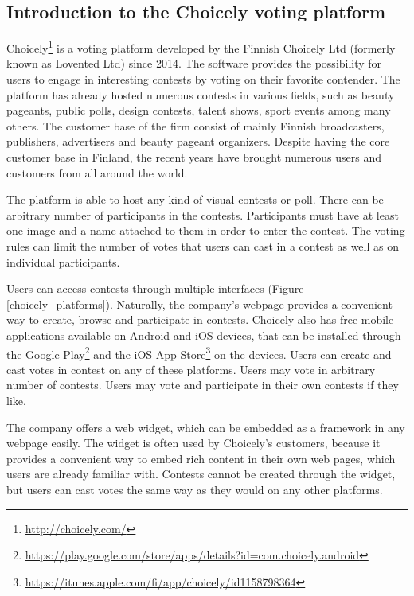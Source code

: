 \subsection{Introduction to the Choicely voting platform}
\label{section::introduction-to-the-choicely-voting-platform}
    Choicely\footnote{\url{http://choicely.com/}} is a voting platform developed by the Finnish Choicely Ltd (formerly known as Lovented Ltd) since 2014. The software provides the possibility for users to engage in interesting contests by voting on their favorite contender. The platform has already hosted numerous contests in various fields, such as beauty pageants, public polls, design contests, talent shows, sport events among many others. The customer base of the firm consist of mainly Finnish broadcasters, publishers, advertisers and beauty pageant organizers. Despite having the core customer base in Finland, the recent years have brought numerous users and customers from all around the world. 
    
    The platform is able to host any kind of visual contests or poll. There can be arbitrary number of  participants in the contests. Participants must have at least one image and a name attached to them in order to enter the contest. The voting rules can limit the number of votes that users can cast in a contest as well as on individual participants.

    Users can access contests through multiple interfaces (Figure \ref{choicely_platforms}). Naturally, the company's webpage provides a convenient way to create, browse and participate in contests. Choicely also has free mobile applications available on Android and iOS devices, that can be installed through the Google Play\footnote{\url{https://play.google.com/store/apps/details?id=com.choicely.android}} and the iOS App Store\footnote{\url{https://itunes.apple.com/fi/app/choicely/id1158798364}} on the devices. Users can create and cast votes in contest on any of these platforms. Users may vote in arbitrary number of contests. Users may vote and participate in their own contests if they like.
    
    The company offers a web widget, which can be embedded as a framework in any webpage easily. The widget is often used by Choicely's customers, because it provides a convenient way to embed rich content in their own web pages, which users are already familiar with. Contests cannot be created through the widget, but users can cast votes the same way as they would on any other platforms.

